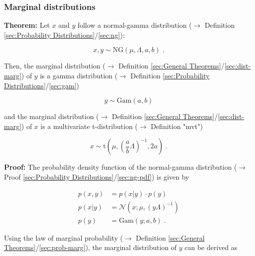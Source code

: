 \documentclass[a4paper,12pt,twoside]{book}
\begin{document}
\subsubsection[\textbf{Marginal distributions}]{Marginal distributions} \label{sec:ng-marg}
\setcounter{equation}{0}

\textbf{Theorem:} Let $x$ and $y$ follow a normal-gamma distribution ($\rightarrow$ Definition \ref{sec:Probability Distributions}/\ref{sec:ng}):

\begin{equation} \label{eq:ng-marg-ng}
x,y \sim \mathrm{NG}(\mu, \Lambda, a, b) \; .
\end{equation}

Then, the marginal distribution ($\rightarrow$ Definition \ref{sec:General Theorems}/\ref{sec:dist-marg}) of $y$ is a gamma distribution ($\rightarrow$ Definition \ref{sec:Probability Distributions}/\ref{sec:gam})

\begin{equation} \label{eq:ng-marg-ng-marg-y}
y \sim \mathrm{Gam}(a, b)
\end{equation}

and the marginal distribution ($\rightarrow$ Definition \ref{sec:General Theorems}/\ref{sec:dist-marg}) of $x$ is a multivariate t-distribution ($\rightarrow$ Definition "mvt")

\begin{equation} \label{eq:ng-marg-ng-marg-x}
x \sim \mathrm{t}\left( \mu, \left(\frac{a}{b} \Lambda \right)^{-1}, 2a \right) \; .
\end{equation}


\vspace{1em}
\textbf{Proof:} The probability density function of the normal-gamma distribution ($\rightarrow$ Proof \ref{sec:Probability Distributions}/\ref{sec:ng-pdf}) is given by

\begin{equation} \label{eq:ng-marg-ng-pdf}
\begin{split}
p(x,y) &= p(x|y) \cdot p(y) \\
p(x|y) &= \mathcal{N}(x; \mu, (y \Lambda)^{-1}) \\
p(y) &= \mathrm{Gam}(y; a, b) \; .
\end{split}
\end{equation}

\vspace{1em}
Using the law of marginal probability ($\rightarrow$ Definition \ref{sec:General Theorems}/\ref{sec:prob-marg}), the marginal distribution of $y$ can be derived as
\end{document}
